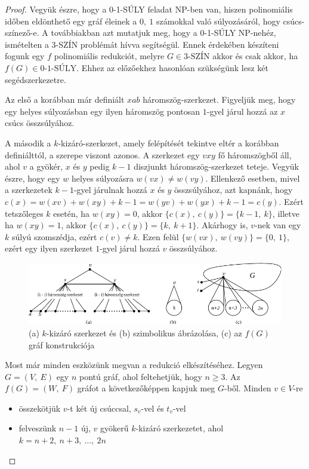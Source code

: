 \documentclass[12pt, a4paper]{report}
\theoremstyle{remark}
\theoremstyle{definition}
\begin{document}
\begin{proof}
Vegyük észre, hogy a 0-1-SÚLY feladat NP-ben van, hiszen polinomiális időben eldönthető egy gráf éleinek a $0,\ 1$ számokkal való súlyozásáról, hogy csúcs-színező-e. A továbbiakban azt mutatjuk meg, hogy a 0-1-SÚLY NP-nehéz, ismételten a 3-SZÍN problémát hívva segítségül. Ennek érdekében készíteni fogunk egy $f$ polinomiális redukciót, melyre $G \in \textrm{3-SZÍN}$ akkor és csak akkor, ha $f(G) \in \textrm{0-1-SÚLY}$. Ehhez az előzőekhez hasonlóan szükségünk lesz két segédszerkezetre.

Az első a korábban már definiált $xab$ háromszög-szerkezet. Figyeljük meg, hogy egy helyes súlyozásban egy ilyen háromszög pontosan $1$-gyel járul hozzá az $x$ csúcs összsúlyához. 

A második a $k$-kizáró-szerkezet, amely felépítését tekintve eltér a korábban definiálttól, a szerepe viszont azonos. A szerkezet egy $vxy$ fő háromszögből áll, ahol $v$ a gyökér, $x$ és $y$ pedig $k - 1$ diszjunkt háromszög-szerkezet teteje. Vegyük észre, hogy egy $w$ helyes súlyozásra $w(vx) \neq w(vy)$. Ellenkező esetben, mivel a szerkezetek $k - 1$-gyel járulnak hozzá $x$ és $y$ összsúlyához, azt kapnánk, hogy $c(x) = w(xv) + w(xy) + k - 1 = w(yv) + w(yx) + k - 1 = c(y)$. Ezért tetszőleges $k$ esetén, ha $w(xy) = 0$, akkor $\lbrace c(x),\ c(y) \rbrace = \lbrace k - 1,\ k \rbrace$, illetve ha $w(xy) = 1$, akkor $\lbrace c(x),\ c(y) \rbrace = \lbrace k,\ k + 1 \rbrace$. Akárhogy is, $v$-nek van egy $k$ súlyú szomszédja, ezért $c(v) \neq k$. Ezen felül $\lbrace w(vx),\ w(vy) \rbrace = \lbrace 0,\ 1 \rbrace$, ezért egy ilyen szerkezet $1$-gyel járul hozzá $v$ összsúlyához.

\begin{figure}[!h]
\centering
\includegraphics[width=\linewidth]{./images/gadgets01}
\caption{(a) $k$-kizáró szerkezet és (b) szimbolikus ábrázolása, (c) az $f(G)$ gráf konstrukciója}
\label{fig:gadgets01}
\end{figure}

Most már minden eszközünk megvan a redukció elkészítéséhez. Legyen $G = (V,\ E)$ egy $n$ pontú gráf, ahol feltehetjük, hogy $n \geq 3$. Az $f(G) = (W,\ F)$ gráfot a következőképpen kapjuk meg $G$-ből. Minden $v \in V$-re
\begin{itemize}
\item összekötjük $v$-t két új csúccsal, $s_v$-vel és $t_v$-vel
\item felveszünk $n - 1$ új, $v$ gyökerű $k$-kizáró szerkezetet, ahol $k = n + 2,\ n + 3,\ \ldots,\ 2n$
\end{itemize}


\end{proof}
\end{document}
